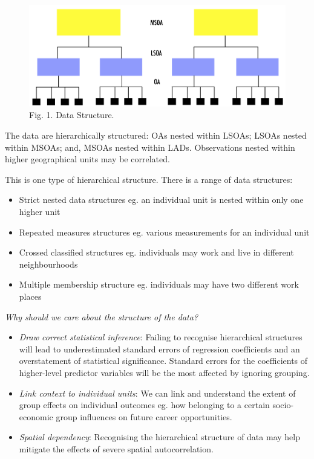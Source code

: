 \documentclass[]{book}
\begin{document}
\begin{figure}
\centering
\includegraphics{figs/ch5/datastr.png}
\caption{Fig. 1. Data Structure.}
\end{figure}

The data are hierarchically structured: OAs nested within LSOAs; LSOAs
nested within MSOAs; and, MSOAs nested within LADs. Observations nested
within higher geographical units may be correlated.

This is one type of hierarchical structure. There is a range of data
structures:

\begin{itemize}
\item
  Strict nested data structures eg. an individual unit is nested within
  only one higher unit
\item
  Repeated measures structures eg. various measurements for an
  individual unit
\item
  Crossed classified structures eg. individuals may work and live in
  different neighbourhoods
\item
  Multiple membership structure eg. individuals may have two different
  work places
\end{itemize}

\emph{Why should we care about the structure of the data?}

\begin{itemize}
\item
  \emph{Draw correct statistical inference}: Failing to recognise
  hierarchical structures will lead to underestimated standard errors of
  regression coefficients and an overstatement of statistical
  significance. Standard errors for the coefficients of higher-level
  predictor variables will be the most affected by ignoring grouping.
\item
  \emph{Link context to individual units}: We can link and understand
  the extent of group effects on individual outcomes eg. how belonging
  to a certain socio-economic group influences on future career
  opportunities.
\item
  \emph{Spatial dependency}: Recognising the hierarchical structure of
  data may help mitigate the effects of severe spatial autocorrelation.
\end{itemize}
\end{document}

